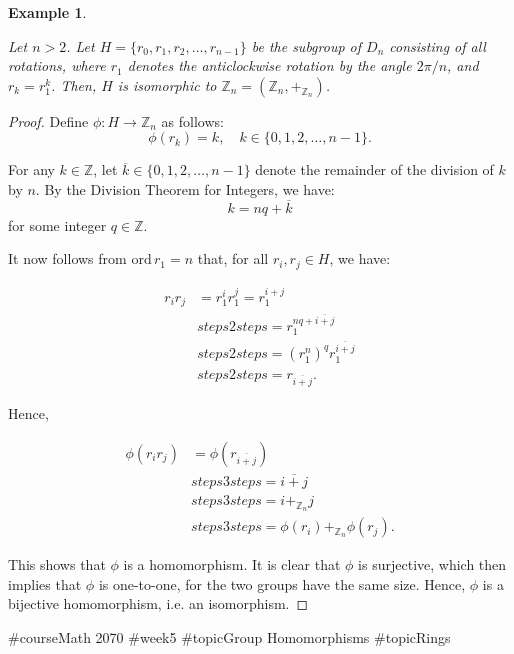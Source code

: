 \documentclass[a4paper,12pt]{report}
\newcommand{\ol}[1]{\overline{#1}}
\newcommand{\ra}{\longrightarrow}
\newcommand{\ord}{\mathrm{ord}\,}
\newcommand{\class}{}
\renewcommand{\ord}{\mathrm{ord}\,}
\newcounter{statement}
\numberwithin{statement}{chapter}
\newtheorem{eg}[statement]{\bf Example}
\numberwithin{equation}{chapter}
\numberwithin{section}{chapter}
\numberwithin{subsection}{section}
\begin{document}
\begin{eg}
\label{eg:cycliczn}


Let $n > 2$.
Let $H = \{r_0, r_1, r_2, \ldots, r_{n - 1}\}$
be the subgroup of $D_n$ consisting of all rotations,
where $r_1$ denotes the anticlockwise rotation by the angle $2\pi/n$,
and $r_k = r_1^k$.
Then, $H$ is isomorphic to $\mathbb{Z}_n = (\mathbb{Z}_n, +_{\mathbb{Z}_n})$.
\end{eg}
\begin{proof}

Define $\phi: H \ra \mathbb{Z}_n$ as follows:
\[\phi(r_k) = k, \quad k \in \{0, 1, 2, \ldots, n - 1\}.\]




For any $k \in \mathbb{Z}$,
let $\ol{k} \in \{0, 1, 2, \ldots, n - 1\}$
denote the remainder of the division of $k$ by $n$.
By the Division Theorem for Integers, we have:
\[
k = nq + \ol{k}
\]
for some integer $q \in \mathbb{Z}$.




It now follows from $\ord r_1 = n$ that,
for all $r_i, r_j \in H$, we have:

\[\begin{split}
r_i r_j &= r_1^i r_1^j = r_1^{i + j}
\\&
\class{steps2 steps}{= r_1^{nq + \ol{i + j}}}
\\
&
\class{steps2 steps}{= \left(r_1^n\right)^q r_1^{\ol{i + j}}}
\\
&
\class{steps2 steps}{= r_{\ol{i + j}}.}
\end{split}\]





Hence,

\[\begin{split}
\phi(r_i r_j) &= \phi(r_{\ol{i + j}})
\\&
\class{steps3 steps}{= \ol{i + j}}
\\&
\class{steps3 steps}{= i +_{\mathbb{Z}_n} j}
\\&
\class{steps3 steps}{=\phi(r_i) +_{\mathbb{Z}_n} \phi(r_j).}
\end{split}\]


This shows that $\phi$ is a homomorphism.
It is clear that $\phi$ is surjective, which then implies that
$\phi$ is one-to-one, for the two groups have the same size.
Hence, $\phi$ is a bijective homomorphism, i.e. an isomorphism.


\end{proof}
#course{Math 2070}
#week{5}
#topic{Group Homomorphisms}
#topic{Rings}
\end{document}
